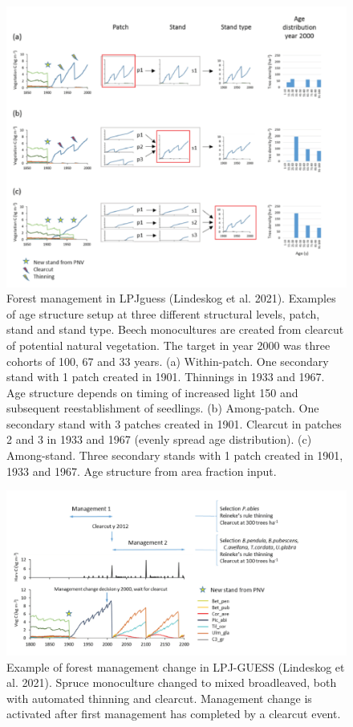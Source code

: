 \documentclass[
  12pt,
  oneside]{book}
\begin{document}
\begin{figure}

{\centering \includegraphics[width=0.8\linewidth]{figures/chap8/f813_LPJ_manag1} 

}

\caption{Forest management in LPJguess (Lindeskog et al. 2021). Examples of age structure setup at three different structural levels, patch, stand and stand type. Beech monocultures are created from clearcut of potential natural vegetation. The target in year 2000 was three cohorts of 100, 67 and 33 years. (a) Within-patch. One secondary stand with 1 patch created in 1901. Thinnings in 1933 and 1967. Age structure depends on timing of increased light 150 and subsequent reestablishment of seedlings. (b) Among-patch. One secondary stand with 3 patches created in 1901. Clearcut in patches 2 and 3 in 1933 and 1967 (evenly spread age distribution). (c) Among-stand. Three secondary stands with 1 patch created in 1901, 1933 and 1967. Age structure from area fraction input.}\label{fig:f813}
\end{figure}

\begin{figure}

{\centering \includegraphics[width=0.8\linewidth]{figures/chap8/f814_LPJmanag2} 

}

\caption{Example of forest management change in LPJ-GUESS (Lindeskog et al. 2021). Spruce monoculture changed to mixed broadleaved, both with automated thinning and clearcut. Management change is activated after first management has completed by a clearcut event.}\label{fig:f814}
\end{figure}
\end{document}
